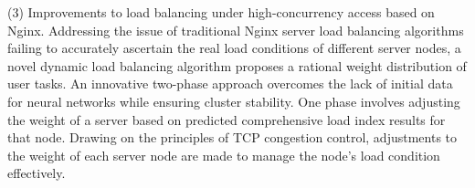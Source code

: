 \begin{eabstract}
(3) Improvements to load balancing under high-concurrency access based on Nginx. Addressing the issue of traditional Nginx server load balancing algorithms failing to accurately ascertain the real load conditions of different server nodes, a novel dynamic load balancing algorithm proposes a rational weight distribution of user tasks. An innovative two-phase approach overcomes the lack of initial data for neural networks while ensuring cluster stability. One phase involves adjusting the weight of a server based on predicted comprehensive load index results for that node. Drawing on the principles of TCP congestion control, adjustments to the weight of each server node are made to manage the node's load condition effectively.

\end{eabstract}

